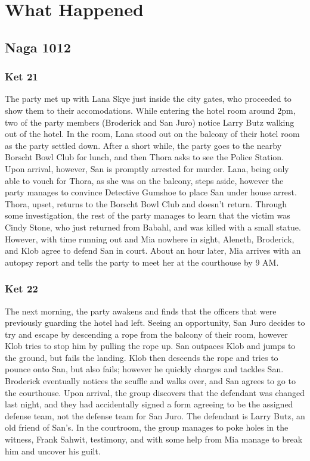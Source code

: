 \section{What Happened}

\subsection{Naga 1012}
\subsubsection{Ket 21}

The party met up with Lana Skye just inside the city gates, who proceeded to show them to their accomodations. While entering the hotel room around 2pm, two of the party members (Broderick and San Juro) notice Larry Butz walking out of the hotel. In the room, Lana stood out on the balcony of their hotel room as the party settled down. After a short while, the party goes to the nearby Borscht Bowl Club for lunch, and then Thora asks to see the Police Station. Upon arrival, however, San is promptly arrested for murder. Lana, being only able to vouch for Thora, as she was on the balcony, steps aside, however the party manages to convince Detective Gumshoe to place San under house arrest. Thora, upset, returns to the Borscht Bowl Club and doesn't return. Through some investigation, the rest of the party manages to learn that the victim was Cindy Stone, who just returned from Babahl, and was killed with a small statue. However, with time running out and Mia nowhere in sight, Aleneth, Broderick, and Klob agree to defend San in court. About an hour later, Mia arrives with an autopsy report and tells the party to meet her at the courthouse by 9 AM. 

\subsubsection{Ket 22}
The next morning, the party awakens and finds that the officers that were previously guarding the hotel had left. Seeing an opportunity, San Juro decides to try and escape by descending a rope from the balcony of their room, however Klob tries to stop him by pulling the rope up. San outpaces Klob and jumps to the ground, but fails the landing. Klob then descends the rope and tries to pounce onto San, but also fails; however he quickly charges and tackles San. Broderick eventually notices the scuffle and walks over, and San agrees to go to the courthouse. Upon arrival, the group discovers that the defendant was changed last night, and they had accidentally signed a form agreeing to be the assigned defense team, not the defense team for San Juro. The defendant is Larry Butz, an old friend of San's. In the courtroom, the group manages to poke holes in the witness, Frank Sahwit, testimony, and with some help from Mia manage to break him and uncover his guilt.

